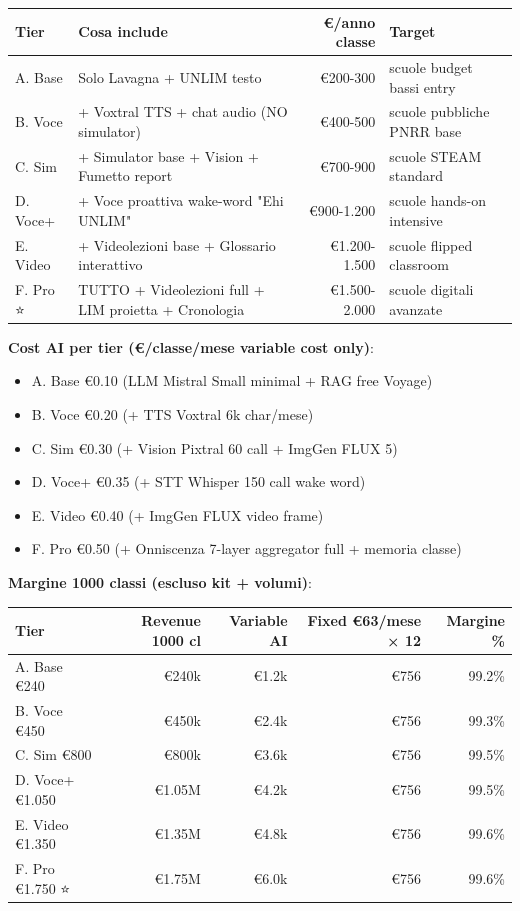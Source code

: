 \documentclass[12pt,a4paper]{article}
\begin{document}
\begin{center}
\begin{tabular}{llrl}
\toprule
\textbf{Tier} & \textbf{Cosa include} & \textbf{€/anno classe} & \textbf{Target} \\
\midrule
A. Base & Solo Lavagna + UNLIM testo & €200-300  & scuole budget bassi entry \\
B. Voce  & + Voxtral TTS + chat audio (NO simulator) & €400-500  & scuole pubbliche PNRR base \\
C. Sim   & + Simulator base + Vision + Fumetto report & €700-900  & scuole STEAM standard \\
D. Voce+ & + Voce proattiva wake-word "Ehi UNLIM" & €900-1.200 & scuole hands-on intensive \\
E. Video & + Videolezioni base + Glossario interattivo & €1.200-1.500 & scuole flipped classroom \\
F. Pro ⭐ & TUTTO + Videolezioni full + LIM proietta + Cronologia & €1.500-2.000 & scuole digitali avanzate \\
\bottomrule
\end{tabular}
\end{center}

\textbf{Cost AI per tier (€/classe/mese variable cost only)}:
\begin{itemize}[leftmargin=*]
  \item A. Base €0.10 (LLM Mistral Small minimal + RAG free Voyage)
  \item B. Voce €0.20 (+ TTS Voxtral 6k char/mese)
  \item C. Sim €0.30 (+ Vision Pixtral 60 call + ImgGen FLUX 5)
  \item D. Voce+ €0.35 (+ STT Whisper 150 call wake word)
  \item E. Video €0.40 (+ ImgGen FLUX video frame)
  \item F. Pro €0.50 (+ Onniscenza 7-layer aggregator full + memoria classe)
\end{itemize}

\textbf{Margine 1000 classi (escluso kit + volumi)}:

\begin{center}
\begin{tabular}{lrrrr}
\toprule
\textbf{Tier} & \textbf{Revenue 1000 cl} & \textbf{Variable AI} & \textbf{Fixed €63/mese × 12} & \textbf{Margine \%} \\
\midrule
A. Base €240    & €240k    & €1.2k & €756 & 99.2\% \\
B. Voce €450    & €450k    & €2.4k & €756 & 99.3\% \\
C. Sim €800     & €800k    & €3.6k & €756 & 99.5\% \\
D. Voce+ €1.050 & €1.05M   & €4.2k & €756 & 99.5\% \\
E. Video €1.350 & €1.35M   & €4.8k & €756 & 99.6\% \\
F. Pro €1.750 ⭐ & €1.75M   & €6.0k & €756 & 99.6\% \\
\bottomrule
\end{tabular}
\end{center}
\end{document}
